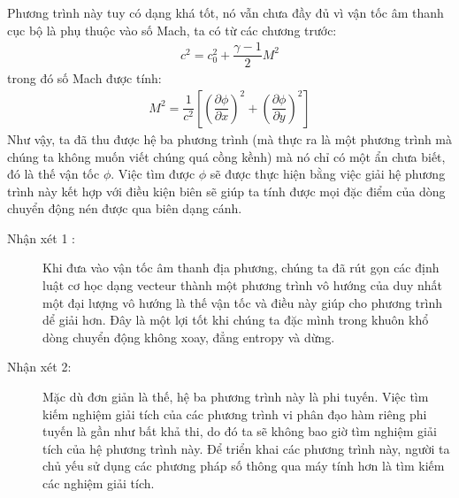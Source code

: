 \documentclass[../../DONG_CHAY_NEN_DUOC.tex]{subfiles}
\begin{document}
Phương trình này tuy có dạng khá tốt, nó vẫn chưa đầy đủ vì vận tốc âm thanh cục bộ là phụ thuộc vào số Mach, ta có từ các chương trước:
	\begin{align}
		c^2=c^2_0+\dfrac{\gamma-1}{2}M^2
	\end{align}
trong đó số Mach được tính:
	\begin{align}
		M^2=\dfrac{1}{c^2}\left[\left(\dfrac{\partial\phi}{\partial x}\right)^2+\left(\dfrac{\partial\phi}{\partial y}\right)^2\right]
	\end{align}
Như vậy, ta đã thu được hệ ba phương trình (mà thực ra là một phương trình mà chúng ta không muốn viết chúng quá cồng kềnh) mà nó chỉ có một ẩn chưa biết, đó là thế vận tốc $\phi$. Việc tìm được $\phi$ sẽ được thực hiện bằng việc giải hệ phương trình này kết hợp với điều kiện biên sẽ giúp ta tính được mọi đặc điểm của dòng chuyển động nén được qua biên dạng cánh.
\begin{description}
	\item[Nhận xét 1 :] Khi đưa vào vận tốc âm thanh địa phương, chúng ta đã rút gọn các định luật cơ học dạng vecteur thành một phương trình vô hướng của duy nhất một đại lượng vô hướng là thế vận tốc và điều này giúp cho phương trình dể giải hơn. Đây là một lợi tốt khi chúng ta đặc mình trong khuôn khổ dòng chuyển động không xoay, đẳng entropy và dừng.
	\item[Nhận xét 2:] Mặc dù đơn giản là thế, hệ ba phương trình này là phi tuyến. Việc tìm kiếm nghiệm giải tích của các phương trình vi phân đạo hàm riêng phi tuyến là gần như bất khả thi, do đó ta sẽ không bao giờ tìm nghiệm giải tích của hệ phương trình này. Để triển khai các phương trình này, người ta chủ yếu sử dụng các phương pháp số thông qua máy tính hơn là tìm kiếm các nghiệm giải tích.
\end{description}
\end{document}
